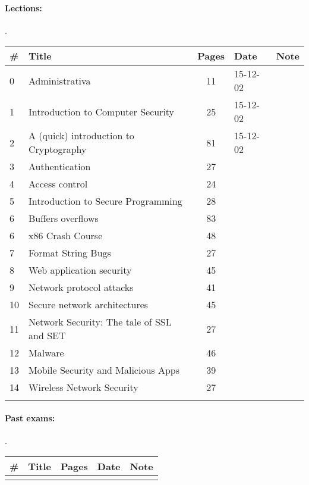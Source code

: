 \documentclass[a4paper,12pt]{article} %
\begin{document}
\paragraph{Lections:}.\\
\begin{tabularx}{\textwidth}{|l|X|c|l|c|}
	\hline
	\# & Title & Pages & Date & Note \\
	\hline
	0 & Administrativa & 11 & 15-12-02 &  \\
	\hline
	1 & Introduction to Computer Security & 25 & 15-12-02 &  \\
	\hline
	2 & A (quick) introduction to Cryptography & 81 & 15-12-02 &  \\
	\hline
	3 & Authentication & 27 &  &  \\
	\hline
	4 & Access control & 24 &  &  \\
	\hline
	5 & Introduction to Secure Programming & 28 &  &  \\
	\hline
	6 & Buffers overflows & 83 &  &  \\
	\hline
	6 & x86 Crash Course & 48 &  &  \\
	\hline
	7 & Format String Bugs & 27 &  &  \\
	\hline
	8 & Web application security & 45 &  &  \\
	\hline
	9 & Network protocol attacks & 41 &  &  \\
	\hline
	10 & Secure network architectures & 45 &  &  \\
	\hline
	11 & Network Security: The tale of SSL and SET & 27 &  &  \\
	\hline
	12 & Malware & 46 &  &  \\
	\hline
	13 & Mobile Security and Malicious Apps & 39 &  &  \\
	\hline
	14 & Wireless Network Security & 27 &  &  \\
	\hline
	&  &  &  &  \\
	\hline
\end{tabularx}

\paragraph{Past exams:}.\\
\begin{tabularx}{\textwidth}{|l|X|c|l|c|}
	\hline
	\# & Title & Pages & Date & Note \\
	\hline
	&  &  &  &  \\
	\hline
\end{tabularx}
\end{document}
